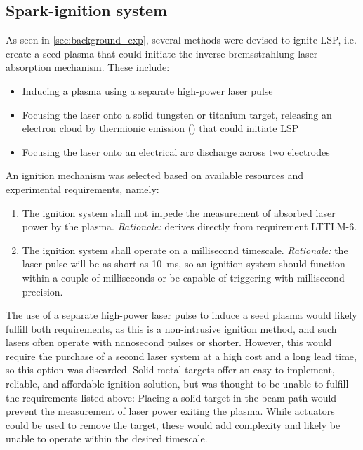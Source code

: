         \subsection{Spark-ignition system}
            As seen in \autoref{sec:background_exp}, several methods were devised to ignite LSP, i.e. create a seed plasma that could initiate the inverse bremsstrahlung laser absorption mechanism. These include:
            \begin{itemize}
                \item Inducing a plasma using a separate high-power laser pulse
                \item Focusing the laser onto a solid tungsten or titanium target, releasing an electron cloud by thermionic emission (\textcite{schwartzLasersustainedGasPlasmas1989}) that could initiate LSP
                \item Focusing the laser onto an electrical arc discharge across two electrodes
            \end{itemize}
            An ignition mechanism was selected based on available resources and experimental requirements, namely:
            \begin{enumerate}
                \item The ignition system shall not impede the measurement of absorbed laser power by the plasma. \emph{Rationale:} derives directly from requirement LTTLM-6.
                \item The ignition system shall operate on a millisecond timescale. \emph{Rationale:} the laser pulse will be as short as 10~ms, so an ignition system should function within a couple of milliseconds or be capable of triggering with millisecond precision.
            \end{enumerate}
            The use of a separate high-power laser pulse to induce a seed plasma would likely fulfill both requirements, as this is a non-intrusive ignition method, and such lasers often operate with nanosecond pulses or shorter. However, this would require the purchase of a second laser system at a high cost and a long lead time, so this option was discarded. Solid metal targets offer an easy to implement, reliable, and affordable ignition solution, but was thought to be unable to fulfill the requirements listed above: Placing a solid target in the beam path would prevent the measurement of laser power exiting the plasma. While actuators could be used to remove the target, these would add complexity and likely be unable to operate within the desired timescale.

